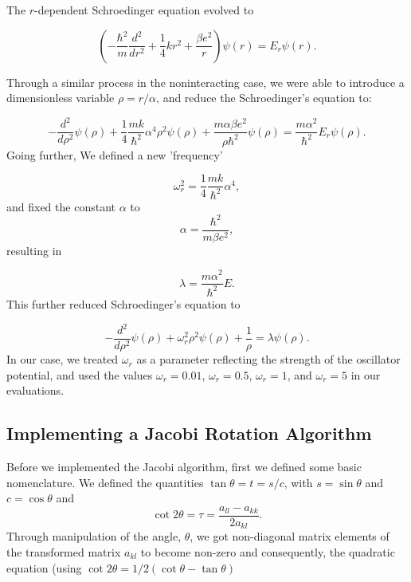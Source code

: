 \documentclass[%
reprint,
superscriptaddress,
showpacs,
nofootinbib,
bibnotes,amsmath,amssymb,aps,
prc, 
]{revtex4-1}
\begin{document}
The $r$-dependent Schroedinger equation evolved to

\begin{equation*}
	\left(  -\frac{\hbar^2}{m} \frac{d^2}{dr^2}+ \frac{1}{4}k r^2+\frac{\beta e^2}{r}\right)\psi(r)  = E_r \psi(r).
\end{equation*}

Through a similar process in the noninteracting case, we were able to introduce a dimensionless variable $\rho = r/\alpha$, and reduce the Schroedinger's equation to:

\begin{equation*}
	-\frac{d^2}{d\rho^2} \psi(\rho) 
	+ \frac{1}{4}\frac{mk}{\hbar^2} \alpha^4\rho^2\psi(\rho)+\frac{m\alpha \beta e^2}{\rho\hbar^2}\psi(\rho)  = 
	\frac{m\alpha^2}{\hbar^2}E_r \psi(\rho) .
\end{equation*}
Going further, We defined a new 'frequency'

\begin{equation*}
	\omega_r^2=\frac{1}{4}\frac{mk}{\hbar^2} \alpha^4,
\end{equation*}
and fixed the constant $\alpha$ to
\begin{equation*}
	\alpha = \frac{\hbar^2}{m\beta e^2},
\end{equation*}
resulting in

\begin{equation*}
	\lambda = \frac{m\alpha^2}{\hbar^2}E.
\end{equation*}
This further reduced Schroedinger's equation to

\begin{equation*}
	-\frac{d^2}{d\rho^2} \psi(\rho) + \omega_r^2\rho^2\psi(\rho) +\frac{1}{\rho} = \lambda \psi(\rho).
\end{equation*}
In our case, we treated $\omega_r$ as a parameter reflecting the strength of the oscillator potential, and used the values
$\omega_r = 0.01$, $\omega_r = 0.5$, $\omega_r =1$, and $\omega_r = 5$ in our evaluations.

\subsection{\label{sec1}Implementing a Jacobi Rotation Algorithm}
Before we implemented the Jacobi algorithm, first we defined some basic nomenclature. We defined the quantities $\tan\theta = t= s/c$, with $s=\sin\theta$ and $c=\cos\theta$ and 
\begin{equation*}\cot 2\theta=\tau = \frac{a_{ll}-a_{kk}}{2a_{kl}}.
\end{equation*}
Through manipulation of the angle, $\theta$, we got non-diagonal matrix elements of the transformed matrix 
$a_{kl}$ to become non-zero and
consequently, the quadratic equation (using $\cot 2\theta=1/2(\cot \theta-\tan\theta)$
\end{document}
